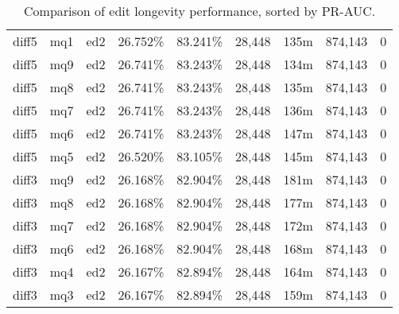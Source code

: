 \begin{sidewaystable}[!ph]
\begin{center}
\begin{tabular}{|c|c|c||c|c||c|c|c|c|}
diff5 & mq1 & ed2 & 26.752\% & 83.241\% & 28,448 & 135m & 874,143 & 0 \\
diff5 & mq9 & ed2 & 26.741\% & 83.243\% & 28,448 & 134m & 874,143 & 0 \\
diff5 & mq8 & ed2 & 26.741\% & 83.243\% & 28,448 & 135m & 874,143 & 0 \\
diff5 & mq7 & ed2 & 26.741\% & 83.243\% & 28,448 & 136m & 874,143 & 0 \\
diff5 & mq6 & ed2 & 26.741\% & 83.243\% & 28,448 & 147m & 874,143 & 0 \\
diff5 & mq5 & ed2 & 26.520\% & 83.105\% & 28,448 & 145m & 874,143 & 0 \\
diff3 & mq9 & ed2 & 26.168\% & 82.904\% & 28,448 & 181m & 874,143 & 0 \\
diff3 & mq8 & ed2 & 26.168\% & 82.904\% & 28,448 & 177m & 874,143 & 0 \\
diff3 & mq7 & ed2 & 26.168\% & 82.904\% & 28,448 & 172m & 874,143 & 0 \\
diff3 & mq6 & ed2 & 26.168\% & 82.904\% & 28,448 & 168m & 874,143 & 0 \\
diff3 & mq4 & ed2 & 26.167\% & 82.894\% & 28,448 & 164m & 874,143 & 0 \\
diff3 & mq3 & ed2 & 26.167\% & 82.894\% & 28,448 & 159m & 874,143 & 0 \\
\hline
\end{tabular}
\end{center}
\caption{Comparison of edit longevity performance,
    sorted by PR-AUC.}
\label{tab:editshoutK}
\end{sidewaystable}
\clearpage
